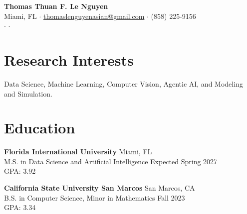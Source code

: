 \documentclass[11pt]{article}
\begin{document}

\begin{center}
    {\Huge\bfseries Thomas Thuan F. Le Nguyen}\\[5pt]

    Miami, FL
    \quad $\cdot$ \quad
    \href{mailto:thomaslenguyenasian@gmail.com}{thomaslenguyenasian@gmail.com}
    \quad $\cdot$ \quad
    (858) 225-9156\\[3pt]

    \href{https://github.com/ThomasLeNguyen}{\faGithub}
    \quad $\cdot$ \quad
    \href{https://www.linkedin.com/in/thomasthuanlenguyen/}{\faLinkedin}
    \quad $\cdot$ \quad
    \href{https://thomasthuanlenguyen.me}{\faGlobe}

\end{center}


\section{Research Interests}

\noindent
Data Science, Machine Learning, Computer Vision, Agentic AI, and Modeling and Simulation.


\section{Education}

\noindent
    \textbf{Florida International University} \hfill Miami, FL\\
    M.S. in Data Science and Artificial Intelligence \hfill Expected Spring 2027\\
    GPA: 3.92

\vspace{0.4em}

\noindent
    \textbf{California State University San Marcos} \hfill San Marcos, CA\\
    B.S. in Computer Science, Minor in Mathematics \hfill Fall 2023\\
    GPA: 3.34

\end{document}

